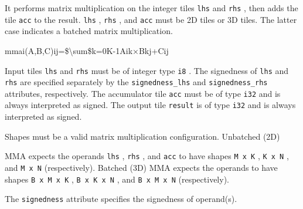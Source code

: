 \documentclass{article}
\begin{document}
It performs matrix multiplication on the integer tiles \texttt{lhs} and \texttt{rhs} , then adds the tile \texttt{acc} to the result. \texttt{lhs} , \texttt{rhs} , and \texttt{acc} must be 2D tiles or 3D tiles. The latter case indicates a batched matrix multiplication.


mmai(A,B,C)ij=\$\textbackslash{}sum\$k=0K-1Aik×Bkj+Cij

Input tiles \texttt{lhs} and \texttt{rhs} must be of integer type \texttt{i8} . The signedness of \texttt{lhs} and \texttt{rhs} are specified separately by the \texttt{signedness\_lhs} and \texttt{signedness\_rhs} attributes, respectively. The accumulator tile \texttt{acc} must be of type \texttt{i32} and is always interpreted as signed. The output tile \texttt{result} is of type \texttt{i32} and is always interpreted as signed.


Shapes must be a valid matrix multiplication configuration. Unbatched (2D)

MMA expects the operands \texttt{lhs} , \texttt{rhs} , and \texttt{acc} to have shapes \texttt{M x K} , \texttt{K x N} , and \texttt{M x N} (respectively). Batched (3D) MMA expects the operands to have shapes \texttt{B x M x K} , \texttt{B x K x N} , and \texttt{B x M x N} (respectively).


The \texttt{signedness} attribute specifies the signedness of operand(s).
\end{document}
